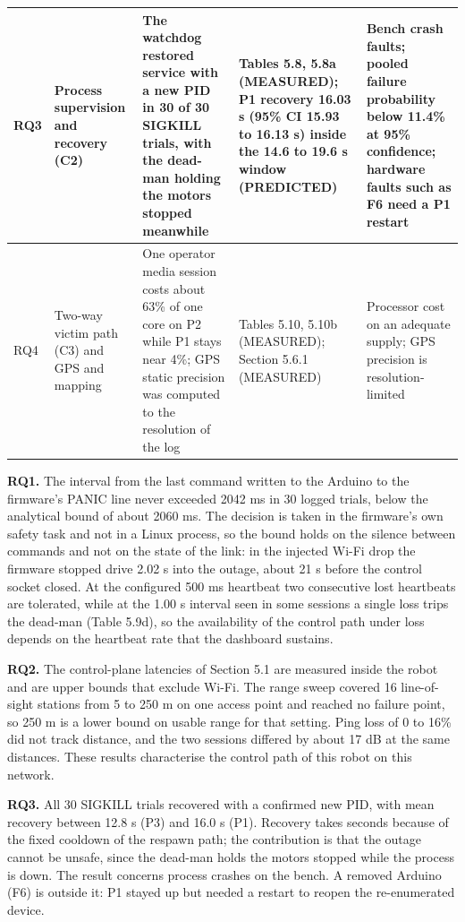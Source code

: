 \begin{center}
\begin{longtable}{|>{\raggedright\arraybackslash}p{0.9cm}|>{\raggedright\arraybackslash}p{2.4cm}|>{\raggedright\arraybackslash}p{3.6cm}|>{\raggedright\arraybackslash}p{3.9cm}|>{\raggedright\arraybackslash}p{3.5cm}|}
\hline
RQ3 & Process supervision and recovery (C2) & The watchdog restored service with a new PID in 30 of 30 SIGKILL trials, with the dead-man holding the motors stopped meanwhile & Tables 5.8, 5.8a (MEASURED); P1 recovery 16.03 s (95\% CI 15.93 to 16.13 s) inside the 14.6 to 19.6 s window (PREDICTED) & Bench crash faults; pooled failure probability below 11.4\% at 95\% confidence; hardware faults such as F6 need a P1 restart \\
\hline
RQ4 & Two-way victim path (C3) and GPS and mapping & One operator media session costs about 63\% of one core on P2 while P1 stays near 4\%; GPS static precision was computed to the resolution of the log & Tables 5.10, 5.10b (MEASURED); Section 5.6.1 (MEASURED) & Processor cost on an adequate supply; GPS precision is resolution-limited \\
\hline
\end{longtable}
\end{center}

\textbf{RQ1.} The interval from the last command written to the Arduino to the firmware's PANIC line never exceeded 2042 ms in 30 logged trials, below the analytical bound of about 2060 ms. The decision is taken in the firmware's own safety task and not in a Linux process, so the bound holds on the silence between commands and not on the state of the link: in the injected Wi-Fi drop the firmware stopped drive 2.02 s into the outage, about 21 s before the control socket closed. At the configured 500 ms heartbeat two consecutive lost heartbeats are tolerated, while at the 1.00 s interval seen in some sessions a single loss trips the dead-man (Table 5.9d), so the availability of the control path under loss depends on the heartbeat rate that the dashboard sustains.

\textbf{RQ2.} The control-plane latencies of Section 5.1 are measured inside the robot and are upper bounds that exclude Wi-Fi. The range sweep covered 16 line-of-sight stations from 5 to 250 m on one access point and reached no failure point, so 250 m is a lower bound on usable range for that setting. Ping loss of 0 to 16\% did not track distance, and the two sessions differed by about 17 dB at the same distances. These results characterise the control path of this robot on this network.

\textbf{RQ3.} All 30 SIGKILL trials recovered with a confirmed new PID, with mean recovery between 12.8 s (P3) and 16.0 s (P1). Recovery takes seconds because of the fixed cooldown of the respawn path; the contribution is that the outage cannot be unsafe, since the dead-man holds the motors stopped while the process is down. The result concerns process crashes on the bench. A removed Arduino (F6) is outside it: P1 stayed up but needed a restart to reopen the re-enumerated device.

